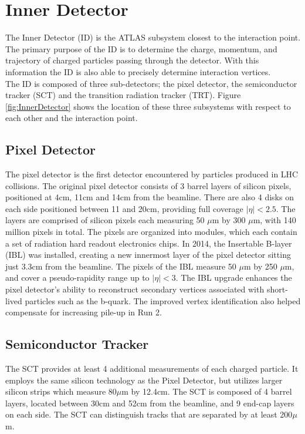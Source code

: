 \section{Inner Detector}

The Inner Detector (ID) is the ATLAS subsystem closest to the interaction point. The primary purpose of the ID is to determine the charge, momentum, and trajectory of charged particles passing through the detector. With this information the ID is also able to precisely determine interaction vertices. \\

The ID is composed of three sub-detectors; the pixel detector, the semiconductor tracker (SCT) and the transition radiation tracker (TRT). Figure \ref{fig:InnerDetector} shows the location of these three subsystems with respect to each other and the interaction point. 

\subsection{Pixel Detector}
The pixel detector is the first detector encountered by particles produced in LHC collisions. The original pixel detector consists of 3 barrel layers of silicon pixels, positioned at 4cm, 11cm and 14cm from the beamline. There are also 4 disks on each side positioned between 11 and 20cm, providing full coverage $|\eta| < 2.5$. The layers are comprised of silicon pixels each measuring 50 $\mu$m by 300 $\mu$m, with 140 million pixels in total. The pixels are organized into modules, which each contain a set of radiation hard readout electronics chips. In 2014, the Insertable B-layer (IBL) was installed, creating a new innermost layer of the pixel detector sitting just 3.3cm from the beamline. The pixels of the IBL measure 50 $\mu$m by 250 $\mu$m, and cover a pseudo-rapidity range up to $|\eta| < 3$. The IBL upgrade enhances the pixel detector's ability to reconstruct secondary vertices associated with short-lived particles such as the b-quark. The improved vertex identification also helped compensate for increasing pile-up in Run 2. 

\subsection{Semiconductor Tracker}
The SCT provides at least 4 additional measurements of each charged particle. It employs the same silicon technology as the Pixel Detector, but utilizes larger silicon strips which measure 80$\mu$m by 12.4cm. The SCT is composed of 4 barrel layers, located between 30cm and 52cm from the beamline, and 9 end-cap layers on each side. The SCT can distinguish tracks that are separated by at least 200$\mu$m.


